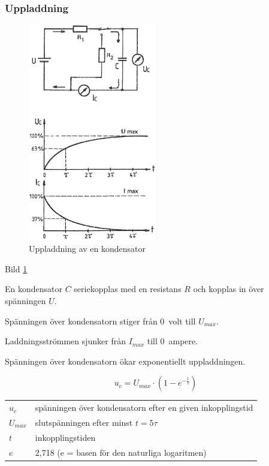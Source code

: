 \subsubsection{Uppladdning}

\begin{figure}
\includegraphics[width=0.5\textwidth]{images/cropped_pdfs/bild_2_3-08.pdf}
\caption{Uppladdning av en kondensator}
\label{fig:BildII3-08}
\end{figure}

Bild \ref{fig:BildII3-08}

En kondensator \(C\) seriekopplas med en resistans \(R\)
och kopplas in över spänningen \(U\).

Spänningen över kondensatorn stiger från 0~volt till \(U_{max}\).

Laddningsströmmen sjunker från \(I_{max}\) till 0~ampere.

Spänningen över kondensatorn ökar exponentiellt uppladdningen.

\[u_c = U_{max} \cdot ( 1 - e^{-\frac{t}{\tau}} )\]

\begin{tabular}{lp{}}
  \(u_c\)     & spänningen över kondensatorn efter en given inkopplingstid \\
  \(U_{max}\) & slutspänningen efter minst \(t = 5\tau\) \\
  \(t\)       & inkopplingstiden \\
  \(e\)       & 2,718 (e = basen för den naturliga logaritmen) \\
\end{tabular}

